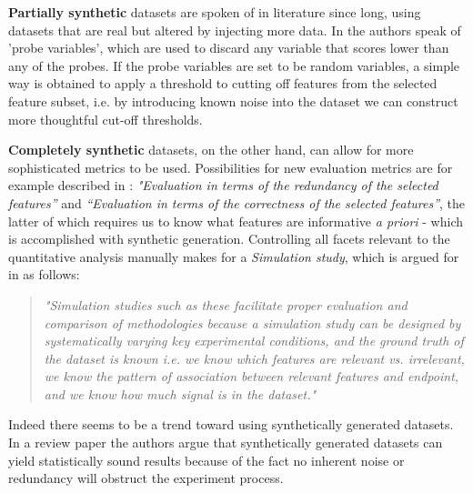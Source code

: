 \documentclass{article}
\begin{document}
\textbf{Partially synthetic} datasets are spoken of in literature since long, using datasets that are real but altered by injecting more data. In \citep{guyon2003introduction} the authors speak of 'probe variables', which are used to discard any variable that scores lower than any of the probes. If the probe variables are set to be random variables, a simple way is obtained to apply a threshold to cutting off features from the selected feature subset, i.e. by introducing known noise into the dataset we can construct more thoughtful cut-off thresholds.

\textbf{Completely synthetic} datasets, on the other hand, can allow for more sophisticated metrics to be used. Possibilities for new evaluation metrics are for example described in \citep{solorio2020review}: \textit{"Evaluation in terms of the redundancy of the selected features”} and \textit{“Evaluation in terms of the correctness of the selected features”}, the latter of which requires us to know what features are informative \textit{a priori} - which is accomplished with synthetic generation. Controlling all facets relevant to the quantitative analysis manually makes for a \textit{Simulation study}, which is argued for in \citep{urbanowicz2018benchmarking} as follows:

\begin{quote}
    \textit{"Simulation studies such as these facilitate proper evaluation and comparison of methodologies because a simulation study can be designed by systematically varying key experimental conditions, and the ground truth of the dataset is known i.e. we know which features are relevant vs. irrelevant, we know the pattern of association between relevant features and endpoint, and we know how much signal is in the dataset."}
\end{quote}

Indeed there seems to be a trend toward using synthetically generated datasets. In a review paper \citep{bolon2013review} the authors argue that synthetically generated datasets can yield statistically sound results because of the fact no inherent noise or redundancy will obstruct the experiment process.
\end{document}
